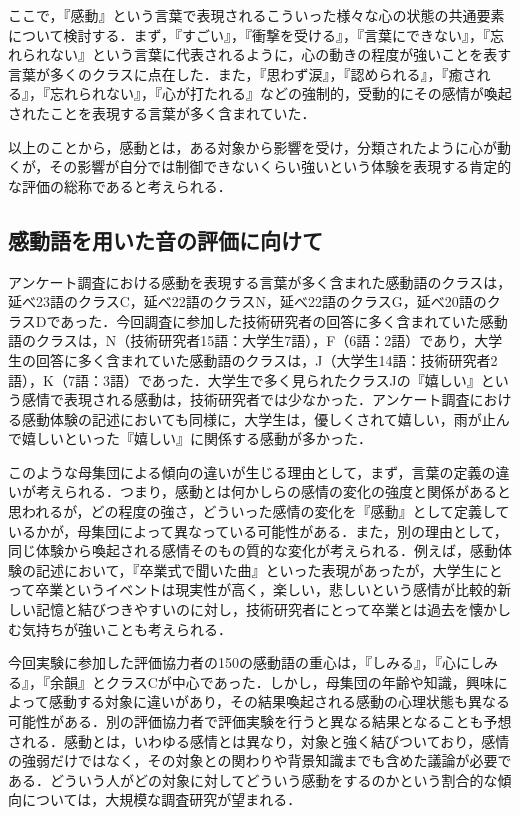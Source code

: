 \documentclass[japanese]{jnlp_1.3c}
\begin{document}
ここで，『感動』という言葉で表現されるこういった様々な心の状態の共通要素について検討する．まず，『すごい』，『衝撃を受ける』，『言葉にできない』，『忘れられない』という言葉に代表されるように，心の動きの程度が強いことを表す言葉が多くのクラスに点在した．また，『思わず涙』，『認められる』，『癒される』，『忘れられない』，『心が打たれる』などの強制的，受動的にその感情が喚起されたことを表現する言葉が多く含まれていた．


以上のことから，感動とは，ある対象から影響を受け，分類されたように心が動くが，その影響が自分では制御できないくらい強いという体験を表現する肯定的な評価の総称であると考えられる．



\subsection{感動語を用いた音の評価に向けて}

アンケート調査における感動を表現する言葉が多く含まれた感動語のクラスは，延べ23語のクラスC，延べ22語のクラスN，延べ22語のクラスG，延べ20語のクラスDであった．今回調査に参加した技術研究者の回答に多く含まれていた感動語のクラスは，N（技術研究者15語：大学生7語），F（6語：2語）であり，大学生の回答に多く含まれていた感動語のクラスは，J（大学生14語：技術研究者2語），K（7語：3語）であった．大学生で多く見られたクラスJの『嬉しい』という感情で表現される感動は，技術研究者では少なかった．アンケート調査における感動体験の記述においても同様に，大学生は，優しくされて嬉しい，雨が止んで嬉しいといった『嬉しい』に関係する感動が多かった．


このような母集団による傾向の違いが生じる理由として，まず，言葉の定義の違いが考えられる．つまり，感動とは何かしらの感情の変化の強度と関係があると思われるが，どの程度の強さ，どういった感情の変化を『感動』として定義しているかが，母集団によって異なっている可能性がある．また，別の理由として，同じ体験から喚起される感情そのもの質的な変化が考えられる．例えば，感動体験の記述において，『卒業式で聞いた曲』といった表現があったが，大学生にとって卒業というイベントは現実性が高く，楽しい，悲しいという感情が比較的新しい記憶と結びつきやすいのに対し，技術研究者にとって卒業とは過去を懐かしむ気持ちが強いことも考えられる．


今回実験に参加した評価協力者の150の感動語の重心は，『しみる』，『心にしみる』，『余韻』とクラスCが中心であった．しかし，母集団の年齢や知識，興味によって感動する対象に違いがあり，その結果喚起される感動の心理状態も異なる可能性がある．別の評価協力者で評価実験を行うと異なる結果となることも予想される．感動とは，いわゆる感情とは異なり，対象と強く結びついており，感情の強弱だけではなく，その対象との関わりや背景知識までも含めた議論が必要である．どういう人がどの対象に対してどういう感動をするのかという割合的な傾向については，大規模な調査研究が望まれる．
\end{document}
